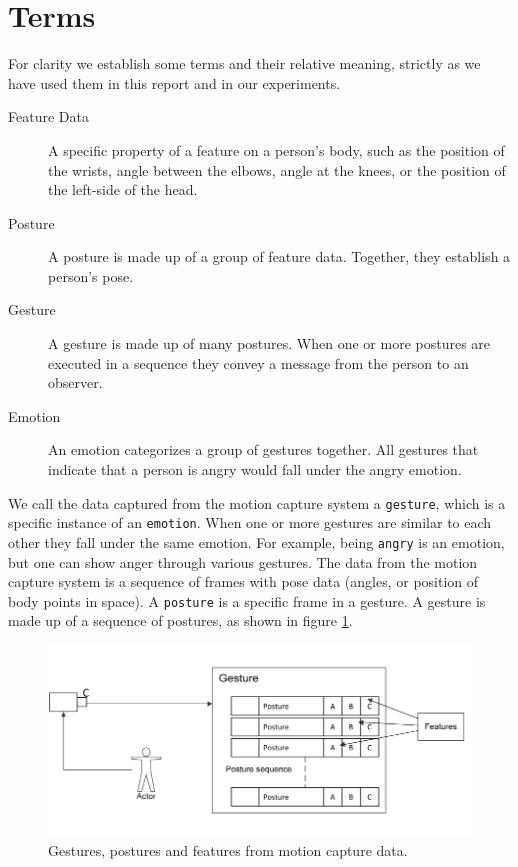\documentclass[]{report}   %
\begin{document}
\section{Terms}
For clarity we establish some terms and their relative meaning, strictly as we have used them in this report and in our experiments.
\begin{description}
  \item[Feature Data] A specific property of a feature on a person's body, such as the position of the wrists, angle between the elbows, angle at the knees, or the position of the left-side of the head. 
  \item[Posture] A posture is made up of a group of feature data. Together, they establish a person's pose. 
  \item[Gesture] A gesture is made up of many postures. When one or more postures are executed in a sequence they convey a message from the person to an observer.
  \item[Emotion] An emotion categorizes a group of gestures together. All gestures that indicate that a person is angry would fall under the angry emotion.
\end{description}

We call the data captured from the motion capture system a \texttt{gesture}, which is a specific instance of an \texttt{emotion}. When one or more gestures are similar to each other they fall under the same emotion. For example, being \texttt{angry} is an emotion, but one can show anger through various gestures. The data from the motion capture system is a sequence of frames with pose data (angles, or position of body points in space). A \texttt{posture} is a specific frame in a gesture. A gesture is made up of a sequence of postures, as shown in figure \ref{fig:fw1}.

\begin{figure}[htbp]
	\centering
		\includegraphics{fw1.pdf}
	\caption{Gestures, postures and features from motion capture data.}
	\label{fig:fw1}
\end{figure}
\end{document}
